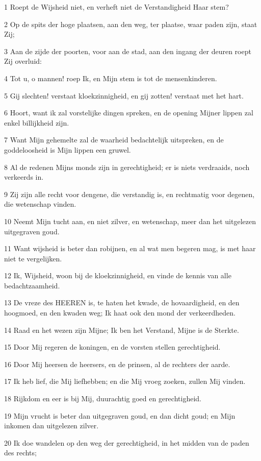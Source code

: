 \par 1 Roept de Wijsheid niet, en verheft niet de Verstandigheid Haar stem?
\par 2 Op de spits der hoge plaatsen, aan den weg, ter plaatse, waar paden zijn, staat Zij;
\par 3 Aan de zijde der poorten, voor aan de stad, aan den ingang der deuren roept Zij overluid:
\par 4 Tot u, o mannen! roep Ik, en Mijn stem is tot de mensenkinderen.
\par 5 Gij slechten! verstaat kloekzinnigheid, en gij zotten! verstaat met het hart.
\par 6 Hoort, want ik zal vorstelijke dingen spreken, en de opening Mijner lippen zal enkel billijkheid zijn.
\par 7 Want Mijn gehemelte zal de waarheid bedachtelijk uitspreken, en de goddeloosheid is Mijn lippen een gruwel.
\par 8 Al de redenen Mijns monds zijn in gerechtigheid; er is niets verdraaids, noch verkeerds in.
\par 9 Zij zijn alle recht voor dengene, die verstandig is, en rechtmatig voor degenen, die wetenschap vinden.
\par 10 Neemt Mijn tucht aan, en niet zilver, en wetenschap, meer dan het uitgelezen uitgegraven goud.
\par 11 Want wijsheid is beter dan robijnen, en al wat men begeren mag, is met haar niet te vergelijken.
\par 12 Ik, Wijsheid, woon bij de kloekzinnigheid, en vinde de kennis van alle bedachtzaamheid.
\par 13 De vreze des HEEREN is, te haten het kwade, de hovaardigheid, en den hoogmoed, en den kwaden weg; Ik haat ook den mond der verkeerdheden.
\par 14 Raad en het wezen zijn Mijne; Ik ben het Verstand, Mijne is de Sterkte.
\par 15 Door Mij regeren de koningen, en de vorsten stellen gerechtigheid.
\par 16 Door Mij heersen de heersers, en de prinsen, al de rechters der aarde.
\par 17 Ik heb lief, die Mij liefhebben; en die Mij vroeg zoeken, zullen Mij vinden.
\par 18 Rijkdom en eer is bij Mij, duurachtig goed en gerechtigheid.
\par 19 Mijn vrucht is beter dan uitgegraven goud, en dan dicht goud; en Mijn inkomen dan uitgelezen zilver.
\par 20 Ik doe wandelen op den weg der gerechtigheid, in het midden van de paden des rechts;

